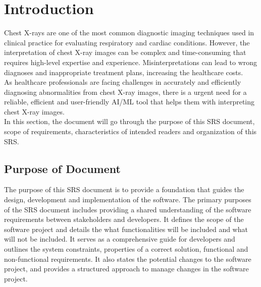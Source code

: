 \documentclass[12pt]{article}
\begin{document}


\section{Introduction}

Chest X-rays are one of the most common diagnostic imaging techniques used in clinical practice for evaluating respiratory and cardiac conditions. However, the interpretation of chest X-ray images can be complex and time-consuming that requires high-level expertise and experience. Misinterpretations can lead to wrong diagnoses and inappropriate treatment plans, increasing the healthcare costs.\\

As healthcare professionals are facing challenges in accurately and efficiently diagnosing abnormalities from chest X-ray images, there is a urgent need for a reliable, efficient and user-friendly AI/ML tool that helps them with interpreting chest X-ray images.\\

In this section, the document will go through the purpose of this SRS document, scope of requirements, characteristics of intended readers and organization of this SRS.\\



\subsection{Purpose of Document}

The purpose of this SRS document is to provide a foundation that guides the design, development and implementation of the software. The primary purposes of the SRS document includes providing a shared understanding of the software requirements between stakeholders and developers. It defines the scope of the software project and details the what functionalities will be included and what will not be included. It serves as a comprehensive guide for developers and outlines the system constraints, properties of a correct solution, functional and non-functional requirements. It also states the potential changes to the software project, and provides a structured approach to manage changes in the software project.\\
\end{document}
